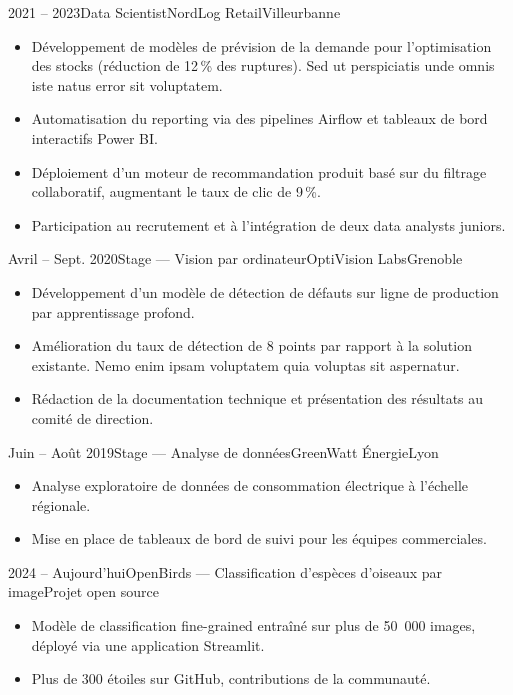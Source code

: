 \documentclass[theme=pringlea]{myrtillecv}
\begin{document}
\begin{cventry}{2021 -- 2023}{Data Scientist}{NordLog Retail}{Villeurbanne}
  \begin{itemize}
    \item Développement de modèles de prévision de la demande pour l'optimisation des stocks (réduction de 12\,\% des ruptures). Sed ut perspiciatis unde omnis iste natus error sit voluptatem.
    \item Automatisation du reporting via des pipelines Airflow et tableaux de bord interactifs Power BI.
    \item Déploiement d'un moteur de recommandation produit basé sur du filtrage collaboratif, augmentant le taux de clic de 9\,\%.
    \item Participation au recrutement et à l'intégration de deux data analysts juniors.
  \end{itemize}
\end{cventry}

\begin{cventry}{Avril -- Sept. 2020}{Stage --- Vision par ordinateur}{OptiVision Labs}{Grenoble}
  \begin{itemize}
    \item Développement d'un modèle de détection de défauts sur ligne de production par apprentissage profond.
    \item Amélioration du taux de détection de 8 points par rapport à la solution existante. Nemo enim ipsam voluptatem quia voluptas sit aspernatur.
    \item Rédaction de la documentation technique et présentation des résultats au comité de direction.
  \end{itemize}
\end{cventry}

\begin{cventry}{Juin -- Août 2019}{Stage --- Analyse de données}{GreenWatt Énergie}{Lyon}
  \begin{itemize}
    \item Analyse exploratoire de données de consommation électrique à l'échelle régionale.
    \item Mise en place de tableaux de bord de suivi pour les équipes commerciales.
  \end{itemize}
\end{cventry}


\begin{cventry}{2024 -- Aujourd'hui}{OpenBirds --- Classification d'espèces d'oiseaux par image}{Projet open source}{}
  \begin{itemize}
    \item Modèle de classification fine-grained entraîné sur plus de 50~000 images, déployé via une application Streamlit.
    \item Plus de 300 étoiles sur GitHub, contributions de la communauté.
  \end{itemize}
\end{cventry}
\end{document}
